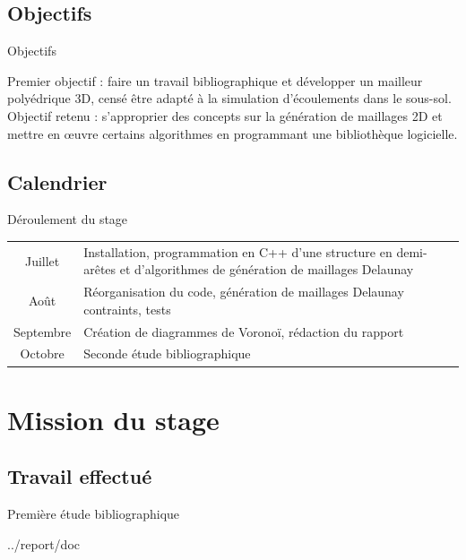 \documentclass[aspectratio=169, 12pt, a4paper, hyperref={pdfauthor={Alexandre MARIN}, pdfkeywords={IFPEN, Delaunay, Voronoi, mesh generation}, colorlinks=true, linkcolor=purple, urlcolor=blue, citecolor=magenta}]{beamer}
\begin{document}
\subsection{Objectifs}
\begin{Energie}{Objectifs}

Premier objectif : faire un travail bibliographique et développer un mailleur polyédrique 3D, censé être adapté à la simulation d'écoulements dans le sous-sol.
\\[1cm]
Objectif retenu : s'approprier des concepts sur la génération de maillages 2D et mettre en \oe{}uvre certains algorithmes en programmant une bibliothèque logicielle.
\end{Energie}

\subsection{Calendrier}
\begin{Energie}{Déroulement du stage}
{\renewcommand{\arraystretch}{1.5}
\renewcommand{\tabcolsep}{0.2cm}
\begin{tabular}{c|p{12cm}}
Juillet & Installation, programmation en C++ d'une structure en demi-arêtes et d'algorithmes de génération de maillages Delaunay\\
Août & Réorganisation du code, génération de maillages Delaunay contraints, tests\\
Septembre & Création de diagrammes de Voronoï, rédaction du rapport\\
Octobre & Seconde étude bibliographique\\
\end{tabular}}
\end{Energie}

\section{Mission du stage}

\subsection{Travail effectué}
\begin{Energie}{Première étude bibliographique}

\begin{btSect}{../report/doc}
\btPrintNotCited
\end{btSect}
\label{biblio}
\end{Energie}
\end{document}
